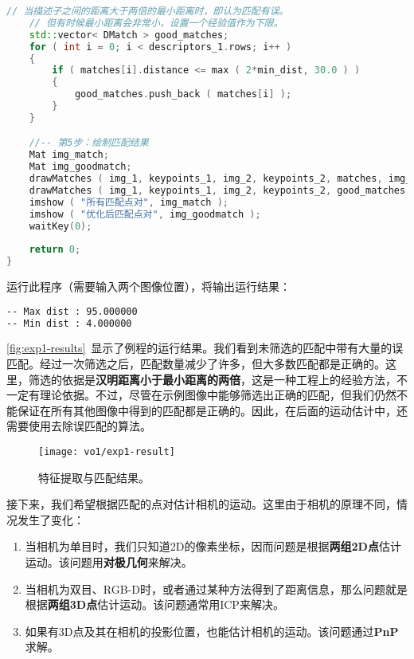 \begin{lstlisting}[language=c++,caption=slambook/ch7/feature_extraction.cpp]
	// 当描述子之间的距离大于两倍的最小距离时，即认为匹配有误。
	// 但有时候最小距离会非常小，设置一个经验值作为下限。
	std::vector< DMatch > good_matches;
	for ( int i = 0; i < descriptors_1.rows; i++ )
	{
		if ( matches[i].distance <= max ( 2*min_dist, 30.0 ) )
		{
			good_matches.push_back ( matches[i] );
		}
	}

	//-- 第5步：绘制匹配结果
	Mat img_match;
	Mat img_goodmatch;
	drawMatches ( img_1, keypoints_1, img_2, keypoints_2, matches, img_match );
	drawMatches ( img_1, keypoints_1, img_2, keypoints_2, good_matches, img_goodmatch );
	imshow ( "所有匹配点对", img_match );
	imshow ( "优化后匹配点对", img_goodmatch );
	waitKey(0);
	
	return 0;
}
\end{lstlisting}

运行此程序（需要输入两个图像位置），将输出运行结果：
\begin{lstlisting}[language=sh]
% build/feature_extraction 1.png 2.png
-- Max dist : 95.000000 
-- Min dist : 4.000000 
\end{lstlisting}

\autoref{fig:exp1-results}~显示了例程的运行结果。我们看到未筛选的匹配中带有大量的误匹配。经过一次筛选之后，匹配数量减少了许多，但大多数匹配都是正确的。这里，筛选的依据是\textbf{汉明距离小于最小距离的两倍}，这是一种工程上的经验方法，不一定有理论依据。不过，尽管在示例图像中能够筛选出正确的匹配，但我们仍然不能保证在所有其他图像中得到的匹配都是正确的。因此，在后面的运动估计中，还需要使用去除误匹配的算法。

\begin{figure}[!htp]
	\centering
	\texttt{[image: vo1/exp1-result]}
	\caption{特征提取与匹配结果。}
	\label{fig:exp1-results} 
\end{figure}

接下来，我们希望根据匹配的点对估计相机的运动。这里由于相机的原理不同，情况发生了变化：

\begin{enumerate}
	\item 当相机为单目时，我们只知道2D的像素坐标，因而问题是根据\textbf{两组2D点}估计运动。该问题用\textbf{对极几何}来解决。
	\item 当相机为双目、RGB-D时，或者通过某种方法得到了距离信息，那么问题就是根据\textbf{两组3D点}估计运动。该问题通常用ICP来解决。
	\item 如果有3D点及其在相机的投影位置，也能估计相机的运动。该问题通过\textbf{PnP}求解。
\end{enumerate}

